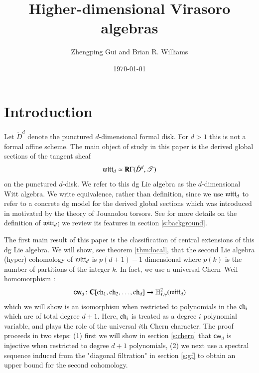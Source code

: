\documentclass[12pt]{article}
\title{Higher-dimensional Virasoro algebras}
\author{Zhengping Gui and Brian R. Williams}
\date{\today}
\newcommand{\1}{{\textbf{\texttt{\tiny{1}}}}}
\newcommand{\2}{\textbf{\texttt{\tiny{2}}}}
\newcommand{\3}{\textbf{\texttt{\tiny{3}}}}
\begin{document}
\maketitle



\section{Introduction}

Let $\mathring{D}^d$ denote the punctured $d$-dimensional formal disk.
For $d > 1$ this is not a formal affine scheme.
The main object of study in this paper is the derived global sections of the tangent sheaf 
\begin{equation}\label{}
  \mathfrak{witt}_d \simeq \mathbf{R} \Gamma(\mathring{D}^d , \mathscr T) 
\end{equation}
on the punctured $d$-disk.
We refer to this dg Lie algebra as the $d$-dimensional Witt algebra.
We write equivalence, rather than definition, since we use $\mathfrak{witt}_d$ to refer to a concrete dg model for the derived global
sections which was introduced in \cite{FHK,GWWchiral} motivated by the theory of Jouanolou torsors.
See \cite{GWvir2d} for more details on the definition of $\mathfrak{witt}_d$; we review its features in section
\ref{s:background}.

The first main result of this paper is the classification of central extensions of this dg Lie algebra.
We will show, see theorem \ref{thm:local}, that the second Lie algebra (hyper) cohomology of $\mathfrak{witt}_d$ is $p(d+1)-1$
dimensional where $p(k)$ is the number of partitions of the integer $k$.
In fact, we use a universal Chern--Weil homomorphism \cite{GWvir2d}:
\begin{equation}\label{}
  \mathsf{cw}_d \colon \mathbf{C}[\operatorname{ch}_1,\operatorname{ch}_2, \ldots, \operatorname{ch}_{d}] \to \mathbb H^2_{Lie} (\mathfrak{witt}_d) 
\end{equation}
which we will show is an isomorphism when restricted to polynomials in the $\operatorname{ch}_i$ which are of total degree $d+1$.
Here, $\operatorname{ch}_i$ is treated as a degree $i$ polynomial variable, and plays the role of the universal $i$th Chern character.
The proof proceeds in two steps: (1) first we will show in section \ref{s:chern} that $\mathsf{cw}_d$ is injective when restricted to degree
$d+1$ polynomials, (2) we next use a spectral sequence induced from the "diagonal filtration" in section \ref{s:gf} to obtain
an upper bound for the second cohomology.
\end{document}
